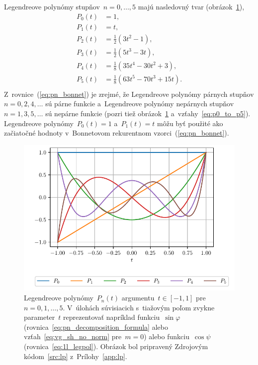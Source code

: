 \documentclass[a4paper, 12pt]{book}
\begin{document}
Legendreove polynómy stupňov~$n = 0, \dots, 5$ majú nasledovný tvar 
(obrázok~\ref{fig:lp}),
%
\begin{equation}
\label{eq:p0_to_p5}
\begin{split}
P_0(t) & = 1{,}\\
P_1(t) & = t{,}\\
P_2(t) & = \frac{1}{2} \left( 3t^2  - 1 \right){,}\\
P_3(t) & = \frac{1}{2} \left(5t^3 - 3t \right){,}\\
P_4(t) & = \frac{1}{8} \left(35t^4 - 30t^2 + 3 \right){,}\\
P_5(t) & = \frac{1}{8} \left(63t^5 - 70t^3 + 15t \right){.}\\
\end{split}
\end{equation}
%
Z~rovnice~(\ref{eq:pn_bonnet}) je zrejmé, že Legendreove polynómy párnych 
stupňov $n = 0, 2, 4, \dots$ sú párne funkcie a~Legendreove polynómy nepárnych 
stupňov $n = 1, 3, 5, \dots$ sú nepárne funkcie (pozri tiež 
obrázok~\ref{fig:lp} a~vzťahy~\ref{eq:p0_to_p5}).  Legendreove polynómy~$P_0(t) 
= 1$ a~$P_1(t) = t$ môžu byť použité ako začiatočné hodnoty v~Bonnetovom 
rekurentnom vzorci~(\ref{eq:pn_bonnet}).

\begin{figure}
\centering
\includegraphics{./fig-legendre-polynomials.pdf}
\caption{Legendreove polynómy~$P_n(t)$ argumentu~$t \in [-1, 1]$ pre~$n = 0, 1, 
\dots, 5$.  V~úlohách súvisiacich s~tiažovým poľom zvykne parameter~$t$ 
reprezentovať napríklad funkciu~$\sin\varphi$ 
(rovnica~\ref{eq:pn_decomposition_formula} alebo vzťah~\ref{eq:vg_sh_no_norm} 
pre~$m = 0$) alebo funkciu~$\cos\psi$ (rovnica~\ref{eq:1l_legpol}).  Obrázok 
bol pripravený Zdrojovým
kódom~\ref{src:lp} z~Prílohy~\ref{app:lp}.}
\label{fig:lp}
\end{figure}
\end{document}
